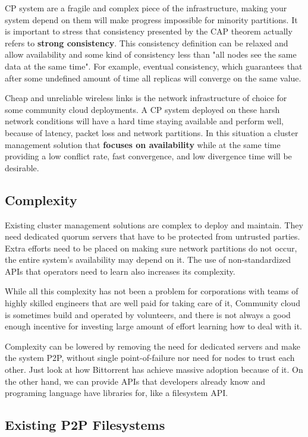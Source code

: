 \documentclass{sig-alternate}
\begin{document}
CP system are a fragile and complex piece of the infrastructure, making your system depend on them will make progress impossible for minority partitions. It is important to stress that consistency presented by the CAP theorem actually refers to \textbf{strong consistency}. This consistency definition can be relaxed and allow availability and some kind of consistency less than "all nodes see the same data at the same time". For example, eventual consistency, which guarantees that after some undefined amount of time all replicas will converge on the same value.

Cheap and unreliable wireless links is the network infrastructure of choice for some community cloud deployments. A CP system deployed on these harsh network conditions will have a hard time staying available and perform well, because of latency, packet loss and network partitions. In this situation a cluster management solution that \textbf{focuses on availability} while at the same time providing a low conflict rate, fast convergence, and low divergence time will be desirable.


\subsection{Complexity}

Existing cluster management solutions are complex to deploy and maintain. They need dedicated quorum servers that have to be protected from untrusted parties. Extra efforts need to be placed on making sure network partitions do not occur, the entire system's availability may depend on it. The use of non-standardized APIs that operators need to learn also increases its complexity.

While all this complexity has not been a problem for corporations with teams of highly skilled engineers that are well paid for taking care of it, Community cloud is sometimes build and operated by volunteers, and there is not always a good enough incentive for investing large amount of effort learning how to deal with it.

Complexity can be lowered by removing the need for dedicated servers and make the system P2P, without single point-of-failure nor need for nodes to trust each other. Just look at how Bittorrent has achieve massive adoption because of it. On the other hand, we can provide APIs that developers already know and programing language have libraries for, like a filesystem API.

\subsection{Existing P2P Filesystems}
\end{document}
